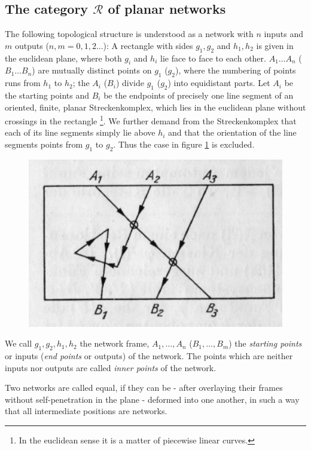 \documentclass{article}
\begin{document}
\subsection{The category $\mathcal{R}$ of planar networks}
The following topological structure is understood as a network with $n$ inputs and $m$ outputs ($n, m = 0, 1, 2...$):
A rectangle with sides $g_1, g_2$ and $h_1, h_2$ is given in the euclidean plane, where both $g_i$ and $h_i$ lie face to face to each other. $A_1 \ldots A_n$ ($B_1 \ldots B_n$) are mutually distinct points on $g_1$ ($g_2$), where the numbering of points runs from $h_1$ to $h_2$; the $A_i$ ($B_i$) divide $g_1$ ($g_2$) into equidistant parts. 
Let $A_i$ be the starting points and $B_i$ be the endpoints of precisely one line segment of an oriented, finite, planar Streckenkomplex, which lies in the euclidean plane without crossings in the rectangle \footnote{In the euclidean sense it is a matter of piecewise linear curves. }. We further demand from the Streckenkomplex that each of its line segments simply lie above $h_i$ and that the orientation of the line segments points from $g_1$ to $g_2$. Thus the case in figure \ref{fig:figure3} is
excluded.
\begin{figure}
\includegraphics[]{figure3.png}
  \centering
\caption{}
\label{fig:figure3}
\end{figure}

We call $g_1, g_2, h_1, h_2$ the network frame, $A_1, \ldots, A_n$ ($B_1, \ldots, B_m$) the \emph{starting points} or inputs (\emph{end points} or outputs) of the network. The points which are neither inputs nor outputs are called \emph{inner points} of the network.

Two networks are called equal, if they can be - after overlaying their frames without self-penetration in the plane - deformed into one another, in such a way that all intermediate positions are networks. 
\end{document}
